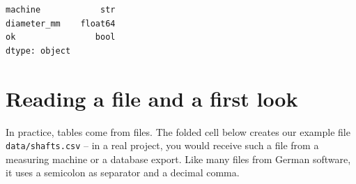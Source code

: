 \documentclass[
  letterpaper,
  DIV=11,
  numbers=noendperiod]{scrreprt}
\begin{document}
\begin{verbatim}
machine            str
diameter_mm    float64
ok                bool
dtype: object
\end{verbatim}

\section*{Reading a file and a first
look}\label{reading-a-file-and-a-first-look}


In practice, tables come from files. The folded cell below creates our
example file \texttt{data/shafts.csv} -- in a real project, you would
receive such a file from a measuring machine or a database export. Like
many files from German software, it uses a semicolon as separator and a
decimal comma.
\end{document}
